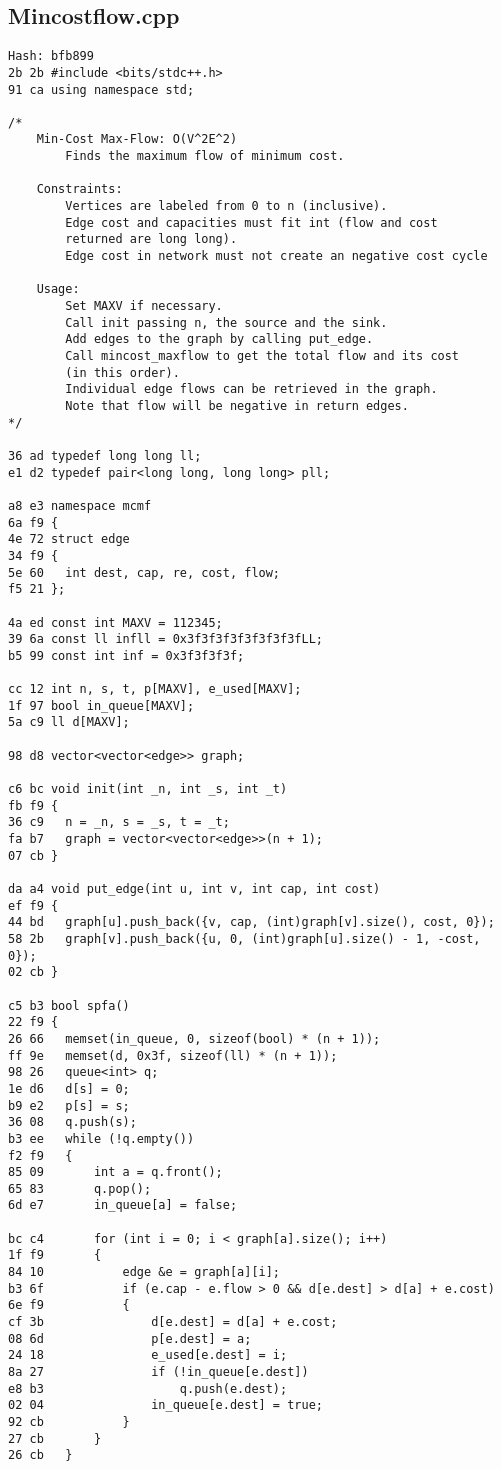 \documentclass[11pt, a4paper, twoside]{article}
\begin{document}
\subsection{Mincostflow.cpp}
\begin{lstlisting}
Hash: bfb899
2b 2b #include <bits/stdc++.h>
91 ca using namespace std;

/*
	Min-Cost Max-Flow: O(V^2E^2)
		Finds the maximum flow of minimum cost.

	Constraints:
		Vertices are labeled from 0 to n (inclusive).
		Edge cost and capacities must fit int (flow and cost 
		returned are long long).
		Edge cost in network must not create an negative cost cycle		

	Usage:
		Set MAXV if necessary.
		Call init passing n, the source and the sink.
		Add edges to the graph by calling put_edge.
		Call mincost_maxflow to get the total flow and its cost 
		(in this order). 
		Individual edge flows can be retrieved in the graph. 
		Note that flow will be negative in return edges.
*/

36 ad typedef long long ll;
e1 d2 typedef pair<long long, long long> pll;

a8 e3 namespace mcmf
6a f9 {
4e 72 struct edge
34 f9 {
5e 60 	int dest, cap, re, cost, flow;
f5 21 };
      
4a ed const int MAXV = 112345;
39 6a const ll infll = 0x3f3f3f3f3f3f3f3fLL;
b5 99 const int inf = 0x3f3f3f3f;
      
cc 12 int n, s, t, p[MAXV], e_used[MAXV];
1f 97 bool in_queue[MAXV];
5a c9 ll d[MAXV];
      
98 d8 vector<vector<edge>> graph;
      
c6 bc void init(int _n, int _s, int _t)
fb f9 {
36 c9 	n = _n, s = _s, t = _t;
fa b7 	graph = vector<vector<edge>>(n + 1);
07 cb }
      
da a4 void put_edge(int u, int v, int cap, int cost)
ef f9 {
44 bd 	graph[u].push_back({v, cap, (int)graph[v].size(), cost, 0});
58 2b 	graph[v].push_back({u, 0, (int)graph[u].size() - 1, -cost, 0});
02 cb }
      
c5 b3 bool spfa()
22 f9 {
26 66 	memset(in_queue, 0, sizeof(bool) * (n + 1));
ff 9e 	memset(d, 0x3f, sizeof(ll) * (n + 1));
98 26 	queue<int> q;
1e d6 	d[s] = 0;
b9 e2 	p[s] = s;
36 08 	q.push(s);
b3 ee 	while (!q.empty())
f2 f9 	{
85 09 		int a = q.front();
65 83 		q.pop();
6d e7 		in_queue[a] = false;
      
bc c4 		for (int i = 0; i < graph[a].size(); i++)
1f f9 		{
84 10 			edge &e = graph[a][i];
b3 6f 			if (e.cap - e.flow > 0 && d[e.dest] > d[a] + e.cost)
6e f9 			{
cf 3b 				d[e.dest] = d[a] + e.cost;
08 6d 				p[e.dest] = a;
24 18 				e_used[e.dest] = i;
8a 27 				if (!in_queue[e.dest])
e8 b3 					q.push(e.dest);
02 04 				in_queue[e.dest] = true;
92 cb 			}
27 cb 		}
26 cb 	}
      

\end{lstlisting}
\end{document}
